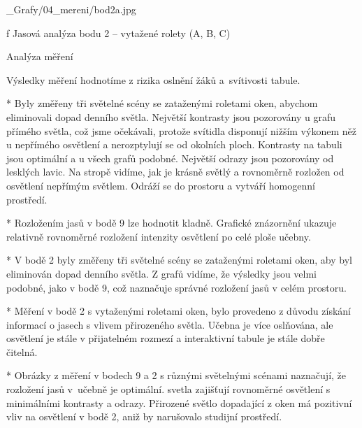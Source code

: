 \medskip
\medskip {}
\picw=14cm _Grafy/04_mereni/bod2a.jpg
\caption/f Jasová analýza bodu 2 -- vytažené rolety (A, B, C)
\medskip
\medskip


\secc Analýza měření

 Výsledky měření hodnotíme z rizika oslnění žáků a~svítivosti tabule.

\medskip {}
\begitems
    * Byly změřeny tři světelné scény se zataženými roletami oken,
        abychom eliminovali dopad denního světla. Největší kontrasty jsou pozorovány u grafu přímého světla,
        což jsme očekávali, protože svítidla disponují nižším výkonem něž u nepřímého osvětlení
        a nerozptylují se od okolních ploch. Kontrasty na tabuli jsou optimální a u všech grafů podobné.
        Největší odrazy jsou pozorovány od lesklých lavic.
        Na stropě vidíme, jak je krásně světlý  a rovnoměrně rozložen od osvětlení
        nepřímým světlem. Odráží se do prostoru a vytváří homogenní prostředí.

    * Rozložením jasů v bodě 9 lze hodnotit kladně. Grafické znázornění ukazuje relativně
        rovnoměrné rozložení intenzity osvětlení po celé ploše učebny.
\enditems

\medskip {}
\begitems
    * V bodě 2 byly změřeny tři světelné scény se zataženými roletami oken,
        aby byl eliminován dopad denního světla. Z grafů vidíme, že výsledky jsou velmi podobné,
        jako v bodě 9, což naznačuje správné rozložení jasů v celém prostoru.
\enditems

\medskip {}
\begitems
    * Měření v bodě 2 s vytaženými roletami oken, bylo provedeno z důvodu získání informací o jasech
        s vlivem přirozeného světla. Učebna je více oslňována,
        ale osvětlení je stále v přijatelném rozmezí a interaktivní tabule je stále dobře čitelná.
\enditems

\medskip {}
\begitems
  *  Obrázky z měření v bodech 9 a 2 s různými světelnými scénami naznačují, že rozložení jasů v~učebně je optimální.
    svetla zajišťují rovnoměrné osvětlení s minimálními kontrasty a odrazy.
    Přirozené světlo dopadající z oken má pozitivní vliv na osvětlení v bodě 2, aniž by narušovalo studijní prostředí.
\enditems





